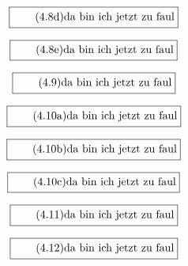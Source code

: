 \documentclass[11pt]{article}
\newcommand{\1}{ {\mathds{1}} }
\begin{document}
    \begin{equation}
      \boxed{
        \tag{4.8d}
        \begin{split}
          \text{da bin ich jetzt zu faul}
        \end{split}
      }
    \end{equation}

    \begin{equation}
      \boxed{
        \tag{4.8e}
        \begin{split}
          \text{da bin ich jetzt zu faul}
        \end{split}
      }
    \end{equation}

    \begin{equation}
      \boxed{
        \tag{4.9}
        \begin{split}
          \text{da bin ich jetzt zu faul}
        \end{split}
      }
    \end{equation}

    \begin{equation}
      \boxed{
        \tag{4.10a}
        \begin{split}
          \text{da bin ich jetzt zu faul}
        \end{split}
      }
    \end{equation}

    \begin{equation}
      \boxed{
        \tag{4.10b}
        \begin{split}
          \text{da bin ich jetzt zu faul}
        \end{split}
      }
    \end{equation}

    \begin{equation}
      \boxed{
        \tag{4.10c}
        \begin{split}
          \text{da bin ich jetzt zu faul}
        \end{split}
      }
    \end{equation}

    \begin{equation}
      \boxed{
        \tag{4.11}
        \begin{split}
          \text{da bin ich jetzt zu faul}
        \end{split}
      }
    \end{equation}

    \begin{equation}
      \boxed{
        \tag{4.12}
        \begin{split}
          \text{da bin ich jetzt zu faul}
        \end{split}
      }
    \end{equation}
\end{document}
